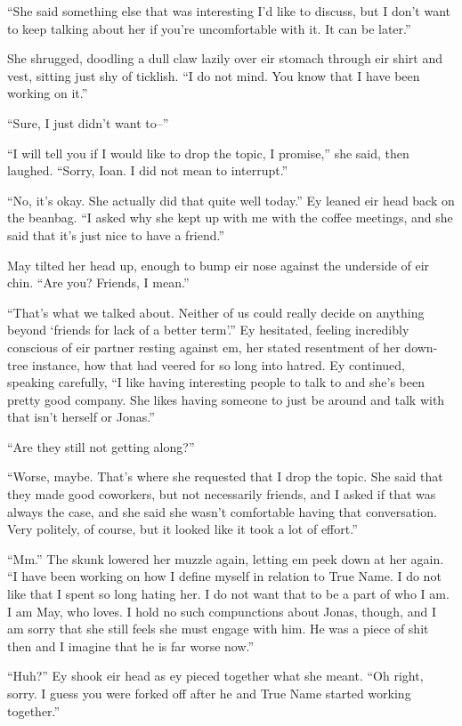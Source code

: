 ``She said something else that was interesting I'd like to discuss, but I don't want to keep talking about her if you're uncomfortable with it. It can be later.''

She shrugged, doodling a dull claw lazily over eir stomach through eir shirt and vest, sitting just shy of ticklish. ``I do not mind. You know that I have been working on it.''

``Sure, I just didn't want to--''

``I will tell you if I would like to drop the topic, I promise,'' she said, then laughed. ``Sorry, Ioan. I did not mean to interrupt.''

``No, it's okay. She actually did that quite well today.'' Ey leaned eir head back on the beanbag. ``I asked why she kept up with me with the coffee meetings, and she said that it's just nice to have a friend.''

May tilted her head up, enough to bump eir nose against the underside of eir chin. ``Are you? Friends, I mean.''

``That's what we talked about. Neither of us could really decide on anything beyond `friends for lack of a better term'.'' Ey hesitated, feeling incredibly conscious of eir partner resting against em, her stated resentment of her down-tree instance, how that had veered for so long into hatred. Ey continued, speaking carefully, ``I like having interesting people to talk to and she's been pretty good company. She likes having someone to just be around and talk with that isn't herself or Jonas.''

``Are they still not getting along?''

``Worse, maybe. That's where she requested that I drop the topic. She said that they made good coworkers, but not necessarily friends, and I asked if that was always the case, and she said she wasn't comfortable having that conversation. Very politely, of course, but it looked like it took a lot of effort.''

``Mm.'' The skunk lowered her muzzle again, letting em peek down at her again. ``I have been working on how I define myself in relation to True Name. I do not like that I spent so long hating her. I do not want that to be a part of who I am. I am May, who loves. I hold no such compunctions about Jonas, though, and I am sorry that she still feels she must engage with him. He was a piece of shit then and I imagine that he is far worse now.''

``Huh?'' Ey shook eir head as ey pieced together what she meant. ``Oh right, sorry. I guess you were forked off after he and True Name started working together.''

